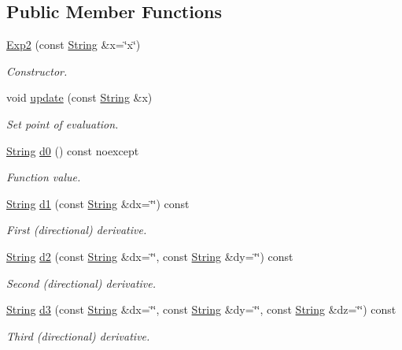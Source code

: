 \subsection*{Public Member Functions}
\begin{DoxyCompactItemize}
\item 
\hyperlink{structFunG_1_1stringify_1_1Exp2_ac3104f75c4473ff5276a3dcb1173c392}{Exp2} (const \hyperlink{structFunG_1_1String}{String} \&x=\char`\"{}x\char`\"{})
\begin{DoxyCompactList}\small\item\em Constructor. \end{DoxyCompactList}\item 
void \hyperlink{structFunG_1_1stringify_1_1Exp2_ada28d06b408c32cbae875d023f141dd5}{update} (const \hyperlink{structFunG_1_1String}{String} \&x)
\begin{DoxyCompactList}\small\item\em Set point of evaluation. \end{DoxyCompactList}\item 
\hyperlink{structFunG_1_1String}{String} \hyperlink{structFunG_1_1stringify_1_1Exp2_a1ccf37b27078775a4ffa5bdcb5b65d99}{d0} () const noexcept
\begin{DoxyCompactList}\small\item\em Function value. \end{DoxyCompactList}\item 
\hyperlink{structFunG_1_1String}{String} \hyperlink{structFunG_1_1stringify_1_1Exp2_ae0ecd0b0cb1b79fe6fae2c7647f27051}{d1} (const \hyperlink{structFunG_1_1String}{String} \&dx=\char`\"{}\char`\"{}) const 
\begin{DoxyCompactList}\small\item\em First (directional) derivative. \end{DoxyCompactList}\item 
\hyperlink{structFunG_1_1String}{String} \hyperlink{structFunG_1_1stringify_1_1Exp2_a69f8b39f66bf404130333d41394e4c94}{d2} (const \hyperlink{structFunG_1_1String}{String} \&dx=\char`\"{}\char`\"{}, const \hyperlink{structFunG_1_1String}{String} \&dy=\char`\"{}\char`\"{}) const 
\begin{DoxyCompactList}\small\item\em Second (directional) derivative. \end{DoxyCompactList}\item 
\hyperlink{structFunG_1_1String}{String} \hyperlink{structFunG_1_1stringify_1_1Exp2_a277ff60c6eece735943e690df73bf121}{d3} (const \hyperlink{structFunG_1_1String}{String} \&dx=\char`\"{}\char`\"{}, const \hyperlink{structFunG_1_1String}{String} \&dy=\char`\"{}\char`\"{}, const \hyperlink{structFunG_1_1String}{String} \&dz=\char`\"{}\char`\"{}) const 
\begin{DoxyCompactList}\small\item\em Third (directional) derivative. \end{DoxyCompactList}\end{DoxyCompactItemize}



